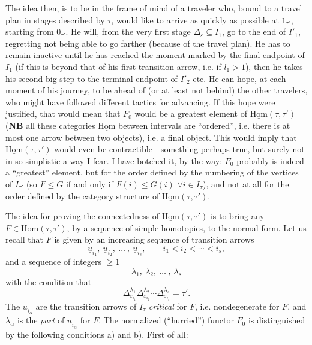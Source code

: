\documentclass[11pt]{article}
\newcommand{\printedpage}[1]{\marginpar{\footnotesize p.~#1}}
\newcommand{\msp}[1]{\marginpar{\footnotesize [#1]}}
\newcommand{\uHom}{\underline{\mathrm{Hom}}}
\newcommand{\ul}[1]{\underline{#1}}
\begin{document}
\printedpage{56}

\msp{page 86}
The idea then, is to be in the frame of mind of a traveler who, bound to a travel plan in stages described by $\tau$, would like to arrive as quickly as possible at $1_{\tau'}$, starting from $0_{\tau'}$. He will, from the very first stage $\Delta_\varepsilon\subseteq I_1$, go to the end of $I'_1$, regretting not being able to go farther (because of the travel plan). He has to remain inactive until he has reached the moment marked by the final endpoint of $I_1$ (if this is beyond that of his first transition arrow, i.e. if $l_1>1$), then he takes his second big step to the terminal endpoint of $I'_2$ etc. He can hope, at each moment of his journey, to be ahead of (or at least not behind) the other travelers, who might have followed different tactics for advancing. If this hope were justified, that would mean that $F_0$ would be a greatest element of $\uHom(\tau,\tau')$ (\textbf{NB} all these categories $\uHom$ between intervals are ``ordered'', i.e. there is at most one arrow between two objects), i.e. a final object. This would imply that $\uHom(\tau,\tau')$ would even be contractible - something perhaps true, but surely not in so simplistic a way I fear. I have botched it, by the way: $F_0$ probably is indeed a ``greatest'' element, but for the order defined by the numbering of the vertices of $I_{\tau'}$ (so $F\leq G$ if and only if $F(i)\leq G(i)$ $\forall i\in I_\tau$), and not at all for the order defined by the category structure of $\uHom(\tau,\tau')$.

\msp{page 87}
The idea for proving the connectedness of $\uHom(\tau,\tau')$ is to bring any $F\in\mathrm{Hom}(\tau,\tau')$, by a sequence of simple homotopies, to the normal form. Let us recall that $F$ is given by an increasing sequence of transition arrows
\[
\ul{u}_{i_1},\ \ul{u}_{i_2},\ \dots\ ,\ \ul{u}_{i_s},\qquad i_1<i_2<\cdots<i_s,
\]
and a sequence of integers $\geq1$
\[
\lambda_1,\ \lambda_2,\ \dots\ ,\ \lambda_s
\]
with the condition that
\[
\Delta^{\lambda_1}_{\varepsilon_{i_1}}\Delta^{\lambda_2}_{\varepsilon_{i_2}}\cdots\Delta^{\lambda_s}_{\varepsilon_{i_s}}=\tau'. \tag*{$(*)$}
\]
The $\ul{u}_{i_\alpha}$ are the transition arrows of $I_\tau$ \textit{critical} for $F$, i.e. nondegenerate for $F$, and $\lambda_\alpha$ is the \textit{part} of $\ul{u}_{i_\alpha}$ for $F$. The normalized (``hurried'') functor $F_0$ is distinguished by the following conditions a) and b). First of all:
\end{document}
